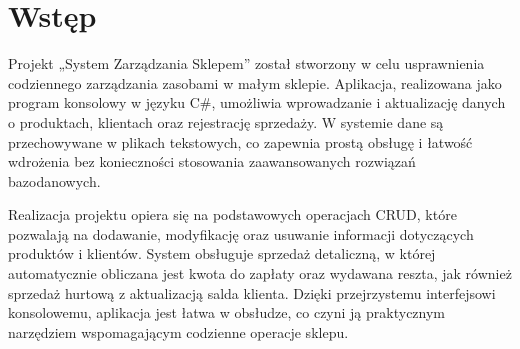 ﻿\chapter*{Wstęp}

Projekt „System Zarządzania Sklepem” został stworzony w celu usprawnienia codziennego zarządzania zasobami w małym sklepie. Aplikacja, realizowana jako program konsolowy w języku C\#, umożliwia wprowadzanie i aktualizację danych o produktach, klientach oraz rejestrację sprzedaży. W systemie dane są przechowywane w plikach tekstowych, co zapewnia prostą obsługę i łatwość wdrożenia bez konieczności stosowania zaawansowanych rozwiązań bazodanowych.

Realizacja projektu opiera się na podstawowych operacjach CRUD, które pozwalają na dodawanie, modyfikację oraz usuwanie informacji dotyczących produktów i klientów. System obsługuje sprzedaż detaliczną, w której automatycznie obliczana jest kwota do zapłaty oraz wydawana reszta, jak również sprzedaż hurtową z aktualizacją salda klienta. Dzięki przejrzystemu interfejsowi konsolowemu, aplikacja jest łatwa w obsłudze, co czyni ją praktycznym narzędziem wspomagającym codzienne operacje sklepu.
